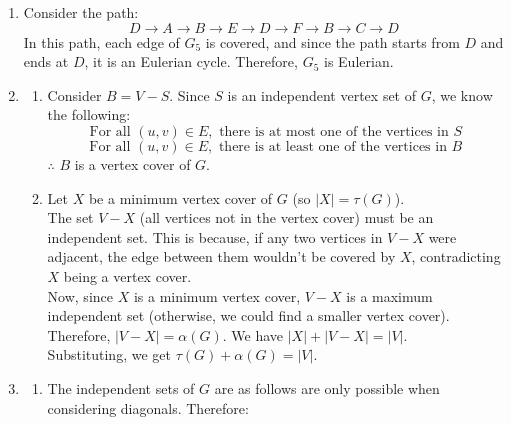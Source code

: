 \documentclass[a4paper]{article}
\begin{document}
\begin{enumerate}
        \newpage
        \item Consider the path:
        \[ D \rightarrow A \rightarrow B \rightarrow E \rightarrow D \rightarrow F \rightarrow B \rightarrow C \rightarrow D \]
        In this path, each edge of $G_5$ is covered, and since the path starts from $D$ and ends at $D$, it is an Eulerian cycle. Therefore, $G_5$ is Eulerian. \\
        
        \item \begin{enumerate}
            \item Consider $B = V - S$. Since $S$ is an independent vertex set of $G$, we know the following:\\
            \[ \text{For all } (u, v) \in E, \text{ there is at most one of the vertices in } S \]
            \[ \text{For all } (u, v) \in E, \text{ there is at least one of the vertices in } B \]
            $\therefore$ $B$ is a vertex cover of $G$. \\

            \item Let $X$ be a minimum vertex cover of $G$ (so $|X| = \tau(G)$). \\

            The set $V - X$ (all vertices not in the vertex cover) must be an independent set. This is because, if any two vertices in $V - X$ were adjacent, the edge between them wouldn't be covered by $X$, contradicting $X$ being a vertex cover.\\
            
            Now, since $X$ is a minimum vertex cover, $V - X$ is a maximum independent set (otherwise, we could find a smaller vertex cover). \\
            
            Therefore, $|V - X| = \alpha(G)$. We have $|X| + |V - X| = |V|$. \\
            
            Substituting, we get $\tau(G) + \alpha(G) = |V|$. \\
        \end{enumerate}

        \item \begin{enumerate}
            \item The independent sets of $G$ are as follows are only possible when considering diagonals. Therefore:\\


\end{enumerate}
\end{enumerate}
\end{document}
